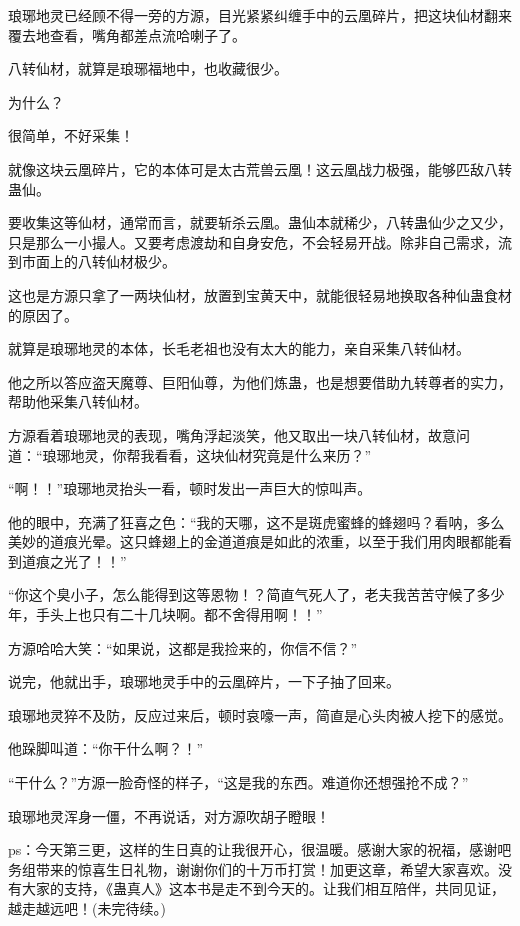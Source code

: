 \begin{this_body}
琅琊地灵已经顾不得一旁的方源，目光紧紧纠缠手中的云凰碎片，把这块仙材翻来覆去地查看，嘴角都差点流哈喇子了。

八转仙材，就算是琅琊福地中，也收藏很少。

为什么？

很简单，不好采集！

就像这块云凰碎片，它的本体可是太古荒兽云凰！这云凰战力极强，能够匹敌八转蛊仙。

要收集这等仙材，通常而言，就要斩杀云凰。蛊仙本就稀少，八转蛊仙少之又少，只是那么一小撮人。又要考虑渡劫和自身安危，不会轻易开战。除非自己需求，流到市面上的八转仙材极少。

这也是方源只拿了一两块仙材，放置到宝黄天中，就能很轻易地换取各种仙蛊食材的原因了。

就算是琅琊地灵的本体，长毛老祖也没有太大的能力，亲自采集八转仙材。

他之所以答应盗天魔尊、巨阳仙尊，为他们炼蛊，也是想要借助九转尊者的实力，帮助他采集八转仙材。

方源看着琅琊地灵的表现，嘴角浮起淡笑，他又取出一块八转仙材，故意问道：“琅琊地灵，你帮我看看，这块仙材究竟是什么来历？”

“啊！！”琅琊地灵抬头一看，顿时发出一声巨大的惊叫声。

他的眼中，充满了狂喜之色：“我的天哪，这不是斑虎蜜蜂的蜂翅吗？看呐，多么美妙的道痕光晕。这只蜂翅上的金道道痕是如此的浓重，以至于我们用肉眼都能看到道痕之光了！！”

“你这个臭小子，怎么能得到这等恩物！？简直气死人了，老夫我苦苦守候了多少年，手头上也只有二十几块啊。都不舍得用啊！！”

方源哈哈大笑：“如果说，这都是我捡来的，你信不信？”

说完，他就出手，琅琊地灵手中的云凰碎片，一下子抽了回来。

琅琊地灵猝不及防，反应过来后，顿时哀嚎一声，简直是心头肉被人挖下的感觉。

他跺脚叫道：“你干什么啊？！”

“干什么？”方源一脸奇怪的样子，“这是我的东西。难道你还想强抢不成？”

琅琊地灵浑身一僵，不再说话，对方源吹胡子瞪眼！

ps：今天第三更，这样的生日真的让我很开心，很温暖。感谢大家的祝福，感谢吧务组带来的惊喜生日礼物，谢谢你们的十万币打赏！加更这章，希望大家喜欢。没有大家的支持，《蛊真人》这本书是走不到今天的。让我们相互陪伴，共同见证，越走越远吧！(未完待续。)

\end{this_body}

